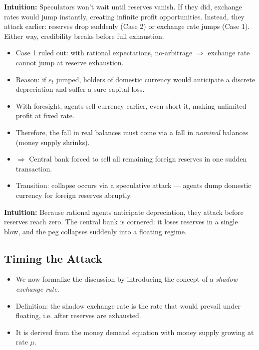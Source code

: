 \documentclass[12pt]{article}
\begin{document}
\noindent\textbf{Intuition:}  
Speculators won’t wait until reserves vanish. If they did, exchange rates would jump instantly, creating infinite profit opportunities. Instead, they attack earlier: reserves drop suddenly (Case 2) or exchange rate jumps (Case 1). Either way, credibility breaks before full exhaustion.

\begin{itemize}
    \item Case 1 ruled out: with rational expectations, no-arbitrage $\Rightarrow$ exchange rate cannot jump at reserve exhaustion. 
    \item Reason: if $e_t$ jumped, holders of domestic currency would anticipate a discrete depreciation and suffer a sure capital loss.
    \item With foresight, agents sell currency earlier, even short it, making unlimited profit at fixed rate.
    \item Therefore, the fall in real balances must come via a fall in \textit{nominal} balances (money supply shrinks).
    \item $\Rightarrow$ Central bank forced to sell all remaining foreign reserves in one sudden transaction.
    \item Transition: collapse occurs via a speculative attack — agents dump domestic currency for foreign reserves abruptly.
\end{itemize}

\noindent\textbf{Intuition:}  
Because rational agents anticipate depreciation, they attack before reserves reach zero. The central bank is cornered: it loses reserves in a single blow, and the peg collapses suddenly into a floating regime.

\subsection*{\noindent\textbf{Timing the Attack}}

\begin{itemize}
    \item We now formalize the discussion by introducing the concept of a \textit{shadow exchange rate}.
    \item Definition: the shadow exchange rate is the rate that would prevail under floating, i.e. after reserves are exhausted.
    \item It is derived from the money demand equation with money supply growing at rate $\mu$.
\end{itemize}
\end{document}
